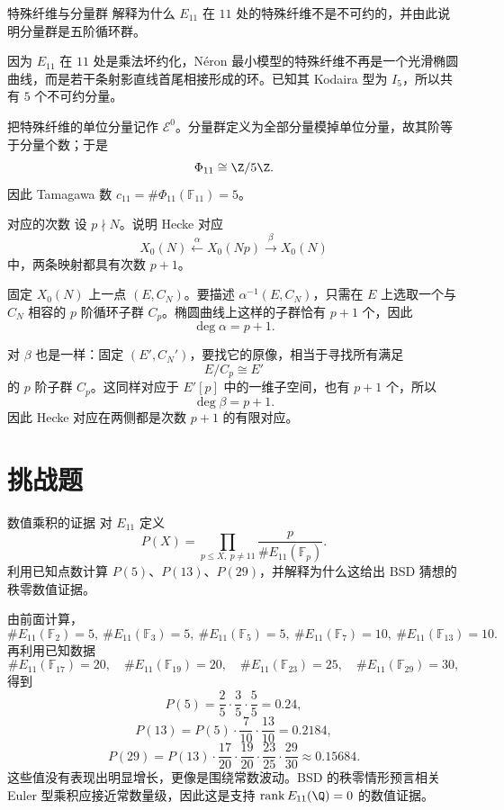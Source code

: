 \begin{problem}{特殊纤维与分量群}
\medium
解释为什么 $E_{11}$ 在 $11$ 处的特殊纤维不是不可约的，并由此说明分量群是五阶循环群。
\end{problem}
\begin{solution}
因为 $E_{11}$ 在 $11$ 处是乘法坏约化，N\'eron 最小模型的特殊纤维不再是一个光滑椭圆曲线，而是若干条射影直线首尾相接形成的环。已知其 Kodaira 型为 $I_5$，所以共有 $5$ 个不可约分量。

把特殊纤维的单位分量记作 $\mathscr{E}^0$。分量群定义为全部分量模掉单位分量，故其阶等于分量个数；于是
\[
\Phi_{11}\cong \Z/5\Z.
\]
因此 Tamagawa 数 $c_{11}=\#\Phi_{11}(\mathbb{F}_{11})=5$。
\end{solution}

\begin{problem}{对应的次数}
\medium
设 $p\nmid N$。说明 Hecke 对应
\[
X_0(N) \xleftarrow{\ \alpha\ } X_0(Np) \xrightarrow{\ \beta\ } X_0(N)
\]
中，两条映射都具有次数 $p+1$。
\end{problem}
\begin{solution}
固定 $X_0(N)$ 上一点 $(E,C_N)$。要描述 $\alpha^{-1}(E,C_N)$，只需在 $E$ 上选取一个与 $C_N$ 相容的 $p$ 阶循环子群 $C_p$。椭圆曲线上这样的子群恰有 $p+1$ 个，因此
\[
\deg \alpha=p+1.
\]

对 $\beta$ 也是一样：固定 $(E',C_N')$，要找它的原像，相当于寻找所有满足
\[
E/C_p\cong E'
\]
的 $p$ 阶子群 $C_p$。这同样对应于 $E'[p]$ 中的一维子空间，也有 $p+1$ 个，所以
\[
\deg \beta=p+1.
\]
因此 Hecke 对应在两侧都是次数 $p+1$ 的有限对应。
\end{solution}

\section{挑战题 \hard}

\begin{problem}{数值乘积的证据}
\hard
对 $E_{11}$ 定义
\[
P(X)=\prod_{p\le X,\ p\ne 11}\frac{p}{\#E_{11}(\mathbb{F}_p)}.
\]
利用已知点数计算 $P(5)$、$P(13)$、$P(29)$，并解释为什么这给出 BSD 猜想的秩零数值证据。
\end{problem}
\begin{solution}
由前面计算，
\[
\#E_{11}(\mathbb{F}_2)=5,
\ \#E_{11}(\mathbb{F}_3)=5,
\ \#E_{11}(\mathbb{F}_5)=5,
\ \#E_{11}(\mathbb{F}_7)=10,
\ \#E_{11}(\mathbb{F}_{13})=10.
\]
再利用已知数据
\[
\#E_{11}(\mathbb{F}_{17})=20,
\quad
\#E_{11}(\mathbb{F}_{19})=20,
\quad
\#E_{11}(\mathbb{F}_{23})=25,
\quad
\#E_{11}(\mathbb{F}_{29})=30,
\]
得到
\[
P(5)=\frac25\cdot\frac35\cdot\frac55=0.24,
\]
\[
P(13)=P(5)\cdot\frac7{10}\cdot\frac{13}{10}=0.2184,
\]
\[
P(29)=P(13)\cdot\frac{17}{20}\cdot\frac{19}{20}\cdot\frac{23}{25}\cdot\frac{29}{30}\approx 0.15684.
\]
这些值没有表现出明显增长，更像是围绕常数波动。BSD 的秩零情形预言相关 Euler 型乘积应接近常数量级，因此这是支持 $\operatorname{rank}E_{11}(\Q)=0$ 的数值证据。
\end{solution}

